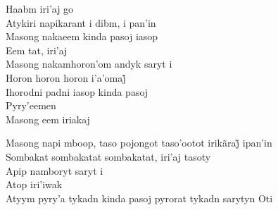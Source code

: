 \begin{linenumbers}\begingroup\raggedright
\noindent Haabm iri'aj go\\
Atykiri napikarant i dibm, i pan'in\\
Masong nakaeem kinda pasoj iasop\\
Eem tat, iri'aj\\
Masong nakamhoron'om andyk saryt i\\
Horon horon horon i’a’omaj̃\\
Ihorodni padni iasop kinda pasoj\\
Pyry'eemen\\
Masong eem iriakaj

\end{linenumbers}\endgroup

\bigskip

\begin{linenumbers}\begingroup\raggedright
\noindent Masong napi mboop, taso pojongot taso’ootot irikãraj̃ ipan’in\\
Sombakat sombakatat sombakatat, iri'aj tasoty\\
Apip namboryt saryt i\\
Atop iri'iwak\\
Atyym pyry'a tykadn kinda pasoj pyrorat tykadn sarytyn Oti

\end{linenumbers}\endgroup


